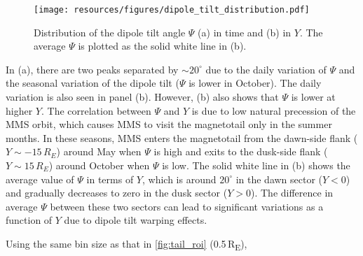 \documentclass[draft]{agujournal2019}
\begin{document}
\begin{figure}
\centering
\noindent\texttt{[image: resources/figures/dipole\_tilt\_distribution.pdf]}
\caption{
Distribution of the dipole tilt angle $\Psi$ (a) in time and (b) in $Y$. The average $\Psi$ is plotted as the solid white line in (b).
}
\label{fig:tilt_distribution}
\end{figure}

In (a), there are two peaks separated by $\sim20^\circ$ due to the daily variation of $\Psi$ and the seasonal variation of the dipole tilt ($\Psi$ is lower in October). The daily variation is also seen in panel (b). However, (b) also shows that $\Psi$ is lower at higher $Y$. The correlation between $\Psi$ and $Y$ is due to low natural precession of the MMS orbit, which causes MMS to visit the magnetotail only in the summer months. In these seasons, MMS enters the magnetotail from the dawn-side flank (${Y\sim-15\,\si{R_E}}$) around May when $\Psi$ is high and exits to the dusk-side flank (${Y\sim15\,\si{R_E}}$) around October when $\Psi$ is low. The solid white line in (b) shows the average value of $\Psi$ in terms of $Y$, which is around $20^\circ$ in the dawn sector (${Y<0}$) and gradually decreases to zero in the dusk sector (${Y>0}$). The difference in average $\Psi$ between these two sectors can lead to significant variations as a function of $Y$ due to dipole tilt warping effects.

Using the same bin size as that in \cref{fig:tail_roi} (0.5\,\si{R_E}),
\end{document}
